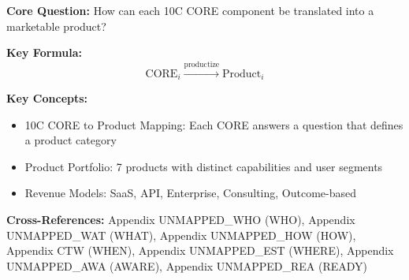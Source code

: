 
\begin{abstract}
This appendix translates the 10C CORE framework into seven distinct product opportunities. Each CORE component (WHO, WHAT, HOW, WHEN, WHERE, AWARE, READY) maps to a specific product category with defined capabilities, use cases, and revenue models. The mapping provides a strategic blueprint for commercializing EBF, demonstrating how theoretical constructs become practical tools for stakeholder analysis, wellbeing assessment, complementarity optimization, context detection, calibration, awareness measurement, and intervention design.
\end{abstract}


\begin{tcolorbox}[colback=blue!5!white, colframe=blue!75!black,
    title=Quick Reference: Product Options Matrix]

\textbf{Core Question:} How can each 10C CORE component be translated into a marketable product?

\textbf{Key Formula:}
\begin{equation}
\text{CORE}_i \xrightarrow{\text{productize}} \text{Product}_i
\end{equation}

\textbf{Key Concepts:}
\begin{itemize}[nosep]
\item 10C CORE to Product Mapping: Each CORE answers a question that defines a product category
\item Product Portfolio: 7 products with distinct capabilities and user segments
\item Revenue Models: SaaS, API, Enterprise, Consulting, Outcome-based
\end{itemize}

\textbf{Cross-References:} Appendix UNMAPPED_WHO (WHO), Appendix UNMAPPED_WAT (WHAT), Appendix UNMAPPED_HOW (HOW), Appendix CTW (WHEN), Appendix UNMAPPED_EST (WHERE), Appendix UNMAPPED_AWA (AWARE), Appendix UNMAPPED_REA (READY)
\end{tcolorbox}


